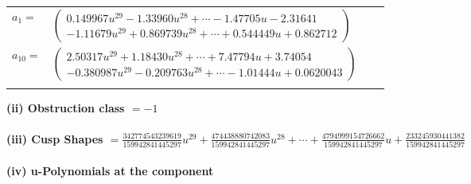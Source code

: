 \documentclass[1p]{elsarticle_modified}
\theoremstyle{definition}
\begin{document}
\begin{tabular}{m{7pt} m{180pt} m{7pt} m{180pt} }
\flushright $a_{1}=$&$\begin{pmatrix}0.149967 u^{29}-1.33960 u^{28}+\cdots-1.47705 u-2.31641\\-1.11679 u^{29}+0.869739 u^{28}+\cdots+0.544449 u+0.862712\end{pmatrix}$ \\
\flushright $a_{10}=$&$\begin{pmatrix}2.50317 u^{29}+1.18430 u^{28}+\cdots+7.47794 u+3.74054\\-0.380987 u^{29}-0.209763 u^{28}+\cdots-1.01444 u+0.0620043\end{pmatrix}$\\&\end{tabular}
\flushleft \textbf{(ii) Obstruction class $= -1$}\\~\\
\flushleft \textbf{(iii) Cusp Shapes $= \frac{342774543239619}{159942841445297} u^{29}+\frac{474438880742083}{159942841445297} u^{28}+\cdots+\frac{4794999154726662}{159942841445297} u+\frac{233245930441382}{159942841445297}$}\\~\\
\newpage\renewcommand{\arraystretch}{1}
\flushleft \textbf{(iv) u-Polynomials at the component}\newline \\
\end{document}
